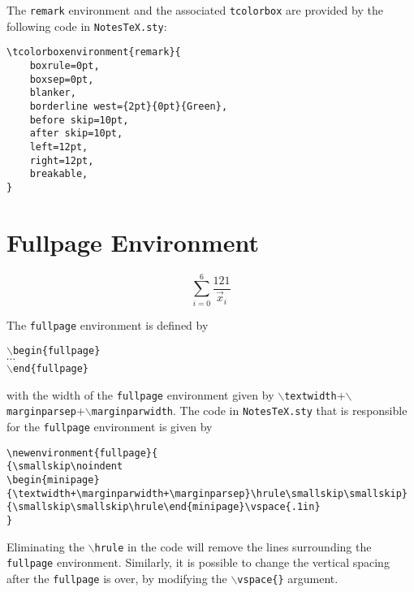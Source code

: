 \documentclass[10pt]{article}
\begin{document}
	\begin{remark}
		The \texttt{remark} environment and the associated \texttt{tcolorbox} are provided by the following code in \texttt{NotesTeX.sty}:
		\begin{lstlisting}[language={[LaTeX]TeX},style=standalone]
\tcolorboxenvironment{remark}{
	boxrule=0pt,
	boxsep=0pt,
	blanker,
	borderline west={2pt}{0pt}{Green},
	before skip=10pt,
	after skip=10pt,
	left=12pt,
	right=12pt,
	breakable,
}
		\end{lstlisting}
	\end{remark}

	\section{Fullpage Environment}\label{Sec: Fullpage}
		\begin{equation}
	\sum^{6}_{i=0}\frac{121}{\vec{x}_i}
	\end{equation}
	\begin{fullpage}
		The \texttt{fullpage} environment is defined by
		\begin{center}
			\texttt{$\backslash$begin\{fullpage\}}\\
			$\cdots$\\
			\texttt{$\backslash$end\{fullpage\}}
		\end{center}
		with the width of the \texttt{fullpage} environment given by \texttt{$\backslash$textwidth}+\texttt{$\backslash$marginparsep}+\texttt{$\backslash$marginparwidth}. The code in \texttt{NotesTeX.sty} that is responsible for the \texttt{fullpage} environment is given by
		\begin{lstlisting}
\newenvironment{fullpage}{
{\smallskip\noindent
\begin{minipage}{\textwidth+\marginparwidth+\marginparsep}\hrule\smallskip\smallskip}
{\smallskip\smallskip\hrule\end{minipage}\vspace{.1in}
}
		\end{lstlisting}
	\end{fullpage}
	\begin{remark}
		Eliminating the \texttt{$\backslash$hrule} in the code will remove the lines surrounding the \texttt{fullpage} environment. Similarly, it is possible to change the vertical spacing after the \texttt{fullpage} is over, by modifying the \texttt{$\backslash$vspace\{\}} argument.
	\end{remark}
\end{document}
